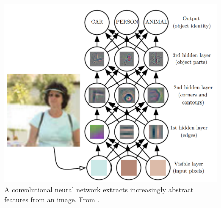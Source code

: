 \begin{figure}[H]
	\begin{center}
		\includegraphics[scale=.7]{img/cnnviz.png}
		\captionsetup{margin=2cm}
		\caption{A convolutional neural network extracts increasingly abstract
			features from an image. From \cite{goodfellow2016deep}.}
		\label{fig:cnnviz}
	\end{center}
\end{figure}
